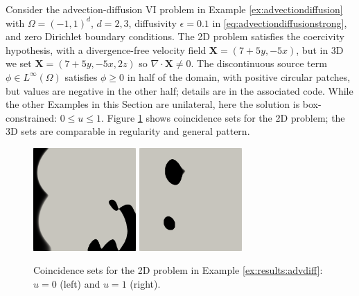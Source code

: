 \documentclass[review,hidelinks,onefignum,onetabnum]{siamart220329}
\newcommand{\eps}{\epsilon}
\newcommand{\grad}{\nabla}
\newcommand{\bX}{\mathbf{X}}
\begin{document}
\begin{example}  \label{ex:results:advdiff}
Consider the advection-diffusion VI problem in Example \ref{ex:advectiondiffusion} with $\Omega=(-1,1)^d$, $d=2,3$, diffusivity $\eps=0.1$ in \eqref{eq:advectiondiffusionstrong}, and zero Dirichlet boundary conditions.  The 2D problem satisfies the coercivity hypothesis, with a divergence-free velocity field $\bX = (7+5y,-5x)$, but in 3D we set $\bX = (7+5y,-5x,2z)$ so $\grad\cdot\bX \ne 0$.  The discontinuous source term $\phi \in L^\infty(\Omega)$ satisfies $\phi\ge 0$ in half of the domain, with positive circular patches, but values are negative in the other half; details are in the associated code.  While the other Examples in this Section are unilateral, here the solution is box-constrained: $0 \le u \le 1$.  Figure \ref{fig:results:advdiff} shows coincidence sets for the 2D problem; the 3D sets are comparable in regularity and general pattern.

\begin{figure}[ht]
\centering
\includegraphics[width=0.35\textwidth]{fixfigs/poll2d-zero-set.png} \qquad \includegraphics[width=0.35\textwidth]{fixfigs/poll2d-one-set.png}
\caption{Coincidence sets for the 2D problem in Example \ref{ex:results:advdiff}: $u=0$ (left) and $u=1$ (right).}
\label{fig:results:advdiff}
\end{figure}


\end{example}
\end{document}
